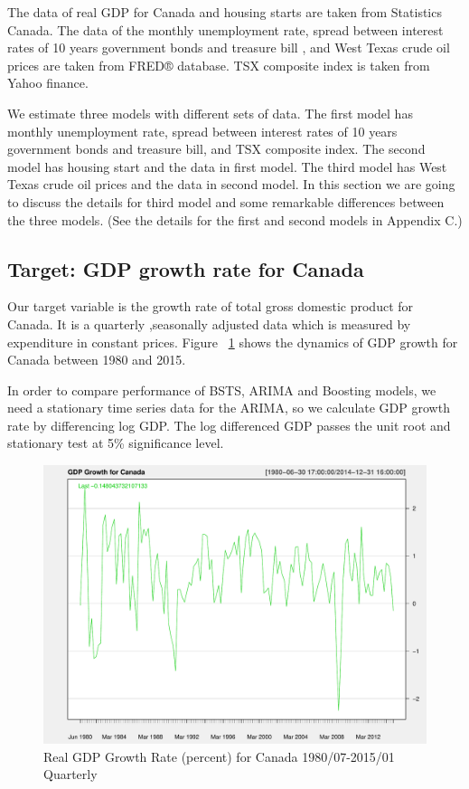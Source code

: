 The data of real GDP for Canada and housing starts are taken from Statistics Canada. The data of the monthly unemployment rate,  spread between interest rates of 10 years government bonds and treasure bill , and   West Texas crude oil prices are taken from FRED® database. TSX composite index is taken from Yahoo finance. 

We estimate three models with different sets of data. The first model has  monthly unemployment rate, spread between interest rates of 10 years government bonds and treasure bill, and TSX composite index. The second model has housing start and the data in first model. The third model has West Texas crude oil prices and the data in second model. In this section we are going to discuss the details for third model and some remarkable differences between the three models. (See the details for the first and second models in Appendix C.)  



\subsection{Target: GDP growth rate for Canada}



Our target variable is the growth rate of total gross domestic product for Canada. It is a quarterly ,seasonally adjusted data which is measured by expenditure in constant prices. Figure ~\ref{fig:gdp-growth} shows the dynamics of GDP growth for Canada between 1980 and 2015.


In order to compare performance of BSTS, ARIMA and Boosting models, we need a stationary time series data for the ARIMA, so we calculate GDP growth rate by   differencing log GDP. The log differenced GDP passes the unit root and stationary test at 5\% significance level.  



\begin{figure}[h]
	\centering
	\includegraphics[width=0.6\linewidth]{Figures/gdp-growth-report}
	\caption{Real GDP Growth Rate (percent)  for Canada 1980/07-2015/01 Quarterly}
	\label{fig:gdp-growth}
\end{figure}


